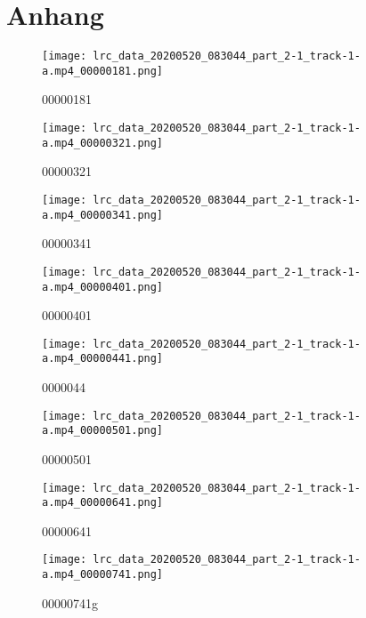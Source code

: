 \section*{Anhang}\label{anhang}

\begin{figure}[htb]
 \centering
 \texttt{[image: lrc\_data\_20200520\_083044\_part\_2-1\_track-1-a.mp4\_00000181.png]}
 \caption[Abbildung im Anhang]{00000181~\cite{0520}}
\label{fig:Abbildung im Anhang}
\end{figure}
\begin{figure}[htb]
 \centering
 \texttt{[image: lrc\_data\_20200520\_083044\_part\_2-1\_track-1-a.mp4\_00000321.png]}
 \caption[Abbildung im Anhang]{00000321~\cite{0520}}
\label{fig:Abbildung im Anhang}
\end{figure}
\begin{figure}[htb]
 \centering
 \texttt{[image: lrc\_data\_20200520\_083044\_part\_2-1\_track-1-a.mp4\_00000341.png]}
 \caption[Abbildung im Anhang]{00000341~\cite{0520}}
\label{fig:Abbildung im Anhang}
\end{figure}
\begin{figure}[htb]
 \centering
 \texttt{[image: lrc\_data\_20200520\_083044\_part\_2-1\_track-1-a.mp4\_00000401.png]}
 \caption[Abbildung im Anhang]{00000401~\cite{0520}}
\label{fig:Abbildung im Anhang}
\end{figure}
\begin{figure}[htb]
 \centering
 \texttt{[image: lrc\_data\_20200520\_083044\_part\_2-1\_track-1-a.mp4\_00000441.png]}
 \caption[Abbildung im Anhang]{0000044~\cite{0520}}
\label{fig:Abbildung im Anhang}
\end{figure}
\begin{figure}[htb]
 \centering
 \texttt{[image: lrc\_data\_20200520\_083044\_part\_2-1\_track-1-a.mp4\_00000501.png]}
 \caption[Abbildung im Anhang]{00000501~\cite{0520}}
\label{fig:Abbildung im Anhang}
\end{figure}
\begin{figure}[htb]
 \centering
 \texttt{[image: lrc\_data\_20200520\_083044\_part\_2-1\_track-1-a.mp4\_00000641.png]}
 \caption[Abbildung im Anhang]{00000641~\cite{0520}}
\label{fig:Abbildung im Anhang}
\end{figure}
\begin{figure}[htb]
 \centering
 \texttt{[image: lrc\_data\_20200520\_083044\_part\_2-1\_track-1-a.mp4\_00000741.png]}
 \caption[Abbildung im Anhang]{00000741g~\cite{0520}}
\label{fig:Abbildung im Anhang}
\end{figure}


